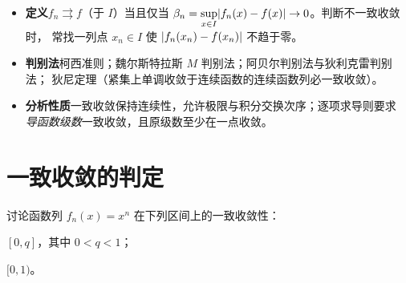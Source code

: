 \documentclass{mojing-exercise}
\begin{document}
\maketitle

\begin{recap}
\begin{itemize}
  \item \textbf{定义}\quad $f_n\rightrightarrows f$（于 $I$）当且仅当
        $\displaystyle\beta_n=\sup_{x\in I}\lvert f_n(x)-f(x)\rvert\to0$。判断不一致收敛时，
        常找一列点 $x_n\in I$ 使 $\lvert f_n(x_n)-f(x_n)\rvert$ 不趋于零。
  \item \textbf{判别法}\quad 柯西准则；魏尔斯特拉斯 $M$ 判别法；阿贝尔判别法与狄利克雷判别法；
        狄尼定理（紧集上单调收敛于连续函数的连续函数列必一致收敛）。
  \item \textbf{分析性质}\quad 一致收敛保持连续性，允许极限与积分交换次序；逐项求导则要求
        \emph{导函数级数}一致收敛，且原级数至少在一点收敛。
\end{itemize}
\end{recap}

\difficultylegend

\section{一致收敛的判定}

\begin{problem}[difficulty=1, space=3.5cm]\label{prob:xn}
讨论函数列 $f_n(x)=x^n$ 在下列区间上的一致收敛性：
\begin{inlinelist}
  \item $[0,q]$，其中 $0<q<1$；
  \item $[0,1)$。
\end{inlinelist}
\end{problem}
\end{document}
